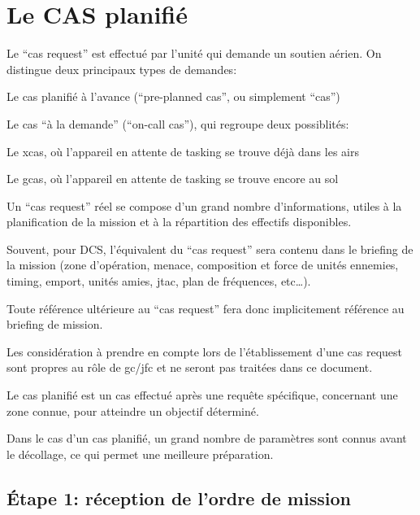 \section{Le CAS planifié}

\e
    \item Le ``\gls{cas} request'' est effectué par l'unité qui demande un soutien aérien. On distingue deux principaux types de demandes:
    \ee
        \item Le \gls{cas} planifié à l'avance (``pre-planned \gls{cas}'', ou simplement ``\gls{cas}'')
        \item Le \gls{cas} ``à la demande'' (``on-call cas''), qui regroupe deux possiblités:
        \eee
            \item Le \gls{xcas}, où l'appareil en attente de tasking se trouve déjà dans les airs
            \item Le \gls{gcas}, où l'appareil en attente de tasking se trouve encore au sol
        \ed
    \ed
    \item Un ``\gls{cas} request'' réel se compose d'un grand nombre d'informations, utiles à la planification de la mission et à la répartition des effectifs disponibles.
    \item
    Souvent, pour DCS, l'équivalent du ``\gls{cas} request'' sera contenu dans le briefing de la mission (zone d'opération, menace, composition et force de unités ennemies, timing, emport, unités amies, \gls{jtac}, plan de fréquences, etc…).
    \item Toute référence ultérieure au ``\gls{cas} request'' fera donc implicitement référence au briefing de mission.
    \item Les considération à prendre en compte lors de l'établissement d'une \gls{cas} request sont propres au rôle de \gls{gc}/\gls{jfc} et ne seront pas traitées dans ce document.
    \item Le \gls{cas} planifié est un \gls{cas} effectué après une requête spécifique, concernant une zone connue, pour atteindre un objectif déterminé.
    \item Dans le cas d'un \gls{cas} planifié, un grand nombre de paramètres sont connus avant le décollage, ce qui permet une meilleure préparation.
\ed

\subsection{Étape 1: réception de l'ordre de mission}

